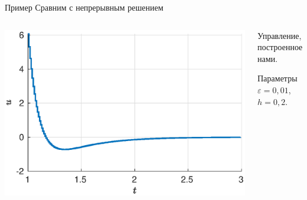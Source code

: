         \begin{frame}{Пример}
                Сравним с непрерывным решением
                \begin{columns}
                        \begin{column}{0.45\textwidth}
                                \includegraphics[width=1.15\textwidth]{content/continuous_task/example/small-control.eps}
                        \end{column}
                        \begin{column}{0.55\textwidth}
                                Управление, построенное нами.

                                \vspace{0.2cm}
                                
                                Параметры $\varepsilon = 0,\!01$, $h = 0,\!2$.


\end{column}
\end{columns}
\end{frame}
